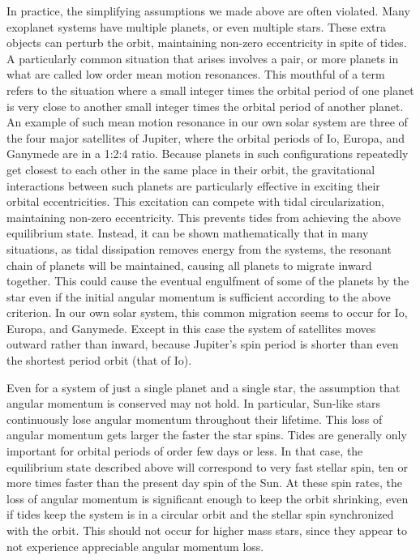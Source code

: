 In practice, the simplifying assumptions we made above are often violated. Many
exoplanet systems have multiple planets, or even multiple stars. These extra
objects can perturb the orbit, maintaining non-zero eccentricity in spite of
tides. A particularly common situation that arises involves a pair, or more
planets in what are called low order mean motion resonances. This mouthful of a
term refers to the situation where a small integer times the orbital period of
one planet is very close to another small integer times the orbital period of
another planet. An example of such mean motion resonance in our own solar system
are three of the four major satellites of Jupiter, where the orbital periods of
Io, Europa, and Ganymede are in a 1:2:4 ratio. Because planets in such
configurations repeatedly get closest to each other in the same place in their
orbit, the gravitational interactions between such planets are particularly
effective in exciting their orbital eccentricities. This excitation can compete
with tidal circularization, maintaining non-zero eccentricity. This prevents
tides from achieving the above equilibrium state. Instead, it can be shown
mathematically that in many situations, as tidal dissipation removes energy from
the systems, the resonant chain of planets will be maintained, causing all
planets to migrate inward together. This could cause the eventual engulfment of
some of the planets by the star even if the initial angular momentum is
sufficient according to the above criterion. In our own solar system, this
common migration seems to occur for Io, Europa, and Ganymede. Except in this
case the system of satellites moves outward rather than inward, because
Jupiter's spin period is shorter than even the shortest period orbit (that of
Io).

Even for a system of just a single planet and a single star, the assumption that
angular momentum is conserved may not hold. In particular, Sun-like stars
continuously lose angular momentum throughout their lifetime. This loss of
angular momentum gets larger the faster the star spins. Tides are generally only
important for orbital periods of order few days or less. In that case, the
equilibrium state described above will correspond to very fast stellar spin, ten
or more times faster than the present day spin of the Sun. At these spin rates,
the loss of angular momentum is significant enough to keep the orbit shrinking,
even if tides keep the system is in a circular orbit and the stellar spin
synchronized with the orbit. This should not occur for higher mass stars, since
they appear to not experience appreciable angular momentum loss.

